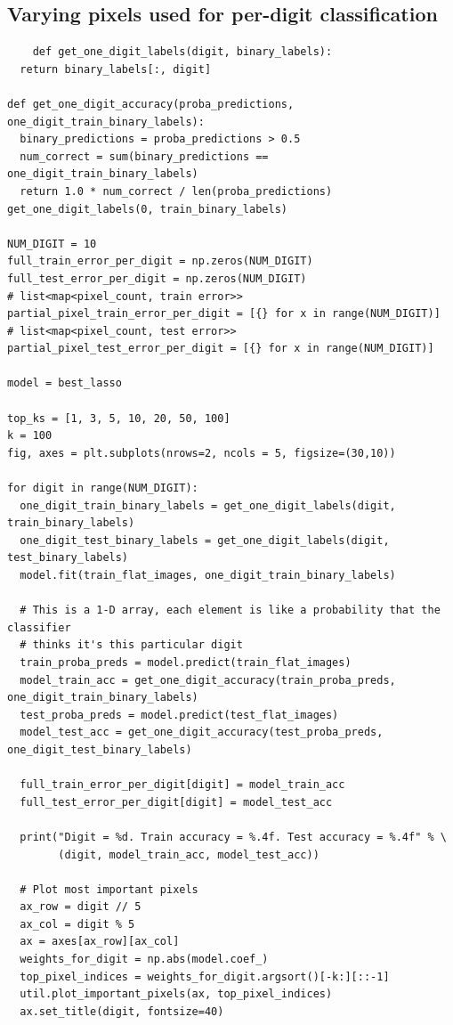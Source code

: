 \documentclass[letterpaper, 10 pt, conference]{ieeeconf}  %
\begin{document}
\subsection*{Varying pixels used for per-digit classification}
\begin{verbatim}
    def get_one_digit_labels(digit, binary_labels):
  return binary_labels[:, digit]

def get_one_digit_accuracy(proba_predictions, one_digit_train_binary_labels):
  binary_predictions = proba_predictions > 0.5
  num_correct = sum(binary_predictions == one_digit_train_binary_labels)
  return 1.0 * num_correct / len(proba_predictions)
get_one_digit_labels(0, train_binary_labels)

NUM_DIGIT = 10
full_train_error_per_digit = np.zeros(NUM_DIGIT)
full_test_error_per_digit = np.zeros(NUM_DIGIT)
# list<map<pixel_count, train error>> 
partial_pixel_train_error_per_digit = [{} for x in range(NUM_DIGIT)]
# list<map<pixel_count, test error>>
partial_pixel_test_error_per_digit = [{} for x in range(NUM_DIGIT)]

model = best_lasso

top_ks = [1, 3, 5, 10, 20, 50, 100]
k = 100
fig, axes = plt.subplots(nrows=2, ncols = 5, figsize=(30,10))

for digit in range(NUM_DIGIT):
  one_digit_train_binary_labels = get_one_digit_labels(digit, train_binary_labels)
  one_digit_test_binary_labels = get_one_digit_labels(digit, test_binary_labels)
  model.fit(train_flat_images, one_digit_train_binary_labels)
  
  # This is a 1-D array, each element is like a probability that the classifier
  # thinks it's this particular digit
  train_proba_preds = model.predict(train_flat_images)
  model_train_acc = get_one_digit_accuracy(train_proba_preds, one_digit_train_binary_labels)
  test_proba_preds = model.predict(test_flat_images)
  model_test_acc = get_one_digit_accuracy(test_proba_preds, one_digit_test_binary_labels)
  
  full_train_error_per_digit[digit] = model_train_acc
  full_test_error_per_digit[digit] = model_test_acc
  
  print("Digit = %d. Train accuracy = %.4f. Test accuracy = %.4f" % \
        (digit, model_train_acc, model_test_acc))
  
  # Plot most important pixels
  ax_row = digit // 5
  ax_col = digit % 5
  ax = axes[ax_row][ax_col]
  weights_for_digit = np.abs(model.coef_)
  top_pixel_indices = weights_for_digit.argsort()[-k:][::-1]
  util.plot_important_pixels(ax, top_pixel_indices)
  ax.set_title(digit, fontsize=40)
  

\end{verbatim}
\end{document}
